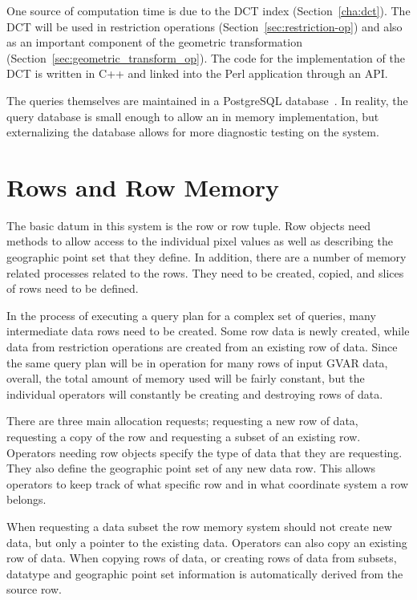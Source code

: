\documentclass{ucdthesis}       %
\begin{document}
One source of computation time is due to the \ac{DCT} index
(Section~\ref{cha:dct}).  The \ac{DCT} will be used in restriction
operations (Section~\ref{sec:restriction-op}) and also as an important
component of the geometric transformation
(Section~\ref{sec:geometric_transform_op}).  The code for the
implementation of the \ac{DCT} is written in C++ and linked into the
Perl application through an \ac{API}.

The queries themselves are maintained in a PostgreSQL
database~\cite{05postg}.  In reality, the query database is small
enough to allow an in memory implementation, but externalizing the
database allows for more diagnostic testing on the system.

\section{Rows and Row Memory}
\label{sec:on-memory}

The basic datum in this system is the row or row tuple.  Row objects
need methods to allow access to the individual pixel values as well as
describing the geographic point set that they define.  In addition, there
are a number of memory related processes related to the rows.  They
need to be created, copied, and slices of rows need to be defined.

In the process of executing a query plan for a complex set of queries,
many intermediate data rows need to be created.  Some row data is
newly created, while data from restriction operations are created
from an existing row of data.  Since the same query plan will be in
operation for many rows of input \ac{GVAR} data, overall, the total
amount of memory used will be fairly constant, but the individual
operators will constantly be creating and destroying rows of data.

There are three main allocation requests; requesting a new row
of data, requesting a copy of the row and requesting a subset of an
existing row.
%   
Operators needing row objects specify the type of data that they are
requesting.  They also define the geographic point set of any new data
row.  This allows operators to keep track of what specific row and in
what coordinate system a row belongs.

When requesting a data subset the row memory system should not create
new data, but only a pointer to the existing data.  Operators can also
copy an existing row of data.  When copying rows of data, or creating
rows of data from subsets, datatype and geographic point set
information is automatically derived from the source row.
\end{document}
